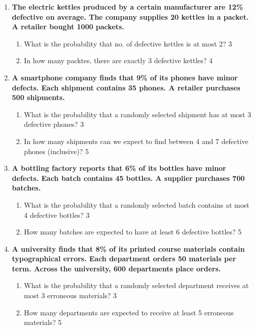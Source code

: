 \documentclass[a4paper,oneside, margin=1.4in]{book}
\begin{document}
\begin{enumerate}
 \item
	  \textbf{The electric kettles produced by a certain manufacturer are 12\% 
	  defective on average. The company supplies 20 kettles in a packet. A retailer
	  bought 1000 packets.} 
  
  \begin{enumerate}
    \item  
	What is the probability that no. of defective kettles is at most 2? \hfill 3
    \item
	In how many packtes, there are exactly 3 defective kettles? \hfill 4
  \end{enumerate}
  
  \item  
  \textbf{A smartphone company finds that 9\% of its phones have minor defects. Each shipment contains 35 phones. A retailer purchases 500 shipments.}  

  \begin{enumerate}  
    \item  
      What is the probability that a randomly selected shipment has at most 3 defective phones? \hfill 3  
    \item  
      In how many shipments can we expect to find between 4 and 7 defective phones (inclusive)? \hfill 5  
  \end{enumerate}  

\item  
  \textbf{A bottling factory reports that 6\% of its bottles have minor defects. Each batch contains 45 bottles. A supplier purchases 700 batches.}  

  \begin{enumerate}  
    \item  
      What is the probability that a randomly selected batch contains at most 4 defective bottles? \hfill 3  
    \item  
      How many batches are expected to have at least 6 defective bottles? \hfill 5  
  \end{enumerate}  

  
  \item  
  \textbf{A university finds that 8\% of its printed course materials contain typographical errors. Each department orders 50 materials per term. Across the university, 600 departments place orders.}  

  \begin{enumerate}  
    \item  
      What is the probability that a randomly selected department receives at most 3 erroneous materials? \hfill 3  
    \item  
      How many departments are expected to receive at least 5 erroneous materials? \hfill 5  
  \end{enumerate}


\end{enumerate}
\end{document}
